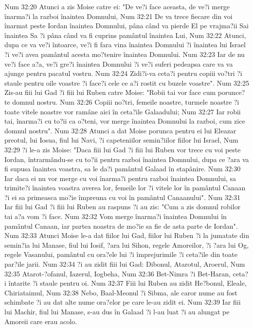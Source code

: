 Num 32:20  Atunci a zis Moise catre ei: "De ve?i face aceasta, de ve?i merge înarma?i la razboi înaintea Domnului,
Num 32:21  De va trece fiecare din voi înarmat peste Iordan înaintea Domnului, pâna când va pierde El pe vrajma?ii Sai înaintea Sa ?i pâna când va fi cuprins pamântul înaintea Lui,
Num 32:22  Atunci, dupa ce va ve?i întoarce, ve?i fi fara vina înaintea Domnului ?i înaintea lui Israel ?i ve?i avea pamântul acesta mo?tenire înaintea Domnului.
Num 32:23  Iar de nu ve?i face a?a, ve?i gre?i înaintea Domnului ?i ve?i suferi pedeapsa care va va ajunge pentru pacatul vostru.
Num 32:24  Zidi?i-va ceta?i pentru copiii vo?tri ?i staule pentru oile voastre ?i face?i cele ce a?i rostit cu buzele voastre".
Num 32:25  Zis-au fiii lui Gad ?i fiii lui Ruben catre Moise: "Robii tai vor face cum porunce?te domnul nostru.
Num 32:26  Copiii no?tri, femeile noastre, turmele noastre ?i toate vitele noastre vor ramâne aici în ceta?ile Galaadului;
Num 32:27  Iar robii tai, înarma?i cu to?ii ca o?teni, vor merge înaintea Domnului la razboi, cum zice domnul nostru".
Num 32:28  Atunci a dat Moise porunca pentru ei lui Eleazar preotul, lui Iosua, fiul lui Navi, ?i capeteniilor semin?iilor fiilor lui Israel,
Num 32:29  ?i le-a zis Moise: "Daca fiii lui Gad ?i fiii lui Ruben vor trece cu voi peste Iordan, întrarmându-se cu to?ii pentru razboi înaintea Domnului, dupa ce ?ara va fi supusa înaintea voastra, sa le da?i pamântul Galaad în stapânire.
Num 32:30  Iar daca ei nu vor merge cu voi înarma?i pentru razboi înaintea Domnului, sa trimite?i înaintea voastra averea lor, femeile lor ?i vitele lor în pamântul Canaan ?i ei sa primeasca mo?ie împreuna cu voi în pamântul Canaanului".
Num 32:31  Iar fiii lui Gad ?i fiii lui Ruben au raspuns ?i au zis: "Cum a zis domnul robilor tai a?a vom ?i face.
Num 32:32  Vom merge înarma?i înaintea Domnului în pamântul Canaan, iar partea noastra de mo?ie sa fie de asta parte de Iordan".
Num 32:33  Atunci Moise le-a dat fiilor lui Gad, fiilor lui Ruben ?i la jumatate din semin?ia lui Manase, fiul lui Iosif, ?ara lui Sihon, regele Amoreilor, ?i ?ara lui Og, regele Vasanului, pamântul cu ora?ele lui ?i împrejurimile ?i ceta?ile din toate par?ile jarii.
Num 32:34  ?i au zidit fiii lui Gad: Dibonul, Atarotul, Aroerul,
Num 32:35  Atarot-?ofanul, Iazerul, Iogbeha,
Num 32:36  Bet-Nimra ?i Bet-Haran, ceta?i întarite ?i staule pentru oi.
Num 32:37  Fiii lui Ruben au zidit He?bonul, Eleale, Chiriataimul,
Num 32:38  Nebo, Baal-Meonul ?i Sibma, ale caror nume au fost schimbate ?i au dat alte nume ora?elor pe care le-au zidit ei.
Num 32:39  Iar fiii lui Machir, fiul lui Manase, s-au dus în Galaad ?i l-au luat ?i au alungat pe Amoreii care erau acolo.

